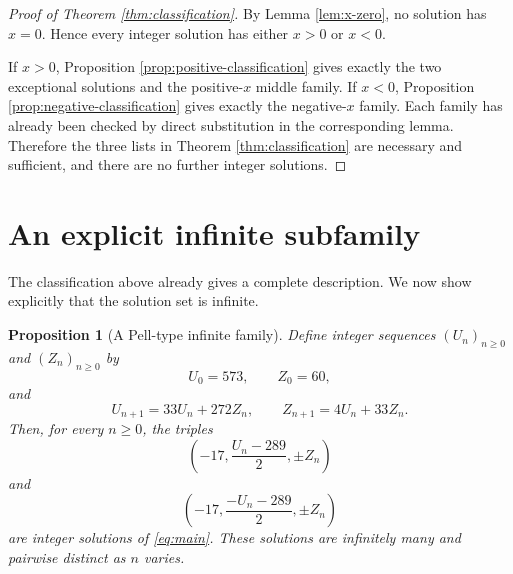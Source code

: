 \documentclass[11pt]{article}
\newtheorem{proposition}[theorem]{Proposition}
\theoremstyle{remark}
\begin{document}
\begin{proof}[Proof of Theorem \ref{thm:classification}]
By Lemma \ref{lem:x-zero}, no solution has $x=0$.  Hence every integer solution has either $x>0$ or $x<0$.

If $x>0$, Proposition \ref{prop:positive-classification} gives exactly the two exceptional solutions and the positive-$x$ middle family.  If $x<0$, Proposition \ref{prop:negative-classification} gives exactly the negative-$x$ family.  Each family has already been checked by direct substitution in the corresponding lemma.  Therefore the three lists in Theorem \ref{thm:classification} are necessary and sufficient, and there are no further integer solutions.
\end{proof}

\section{An explicit infinite subfamily}

The classification above already gives a complete description.  We now show explicitly that the solution set is infinite.

\begin{proposition}[A Pell-type infinite family]\label{prop:pell-family}
Define integer sequences $(U_n)_{n\ge 0}$ and $(Z_n)_{n\ge 0}$ by
\begin{equation}\label{eq:pell-init}
        U_0=573,
        \qquad Z_0=60,
\end{equation}
and
\begin{equation}\label{eq:pell-recursion}
        U_{n+1}=33U_n+272Z_n,
        \qquad
        Z_{n+1}=4U_n+33Z_n.
\end{equation}
Then, for every $n\ge 0$, the triples
\begin{equation}\label{eq:pell-solutions-positive-y}
        \left(-17,\frac{U_n-289}{2},\pm Z_n\right)
\end{equation}
and
\begin{equation}\label{eq:pell-solutions-negative-y}
        \left(-17,\frac{-U_n-289}{2},\pm Z_n\right)
\end{equation}
are integer solutions of \eqref{eq:main}.  These solutions are infinitely many and pairwise distinct as $n$ varies.
\end{proposition}
\end{document}
